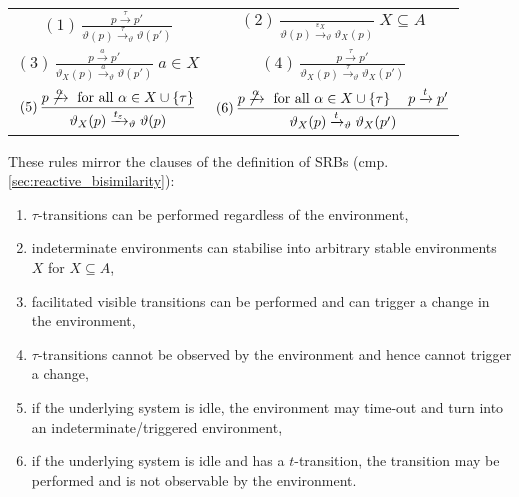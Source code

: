 \begin{isabellebody}
\begin{isamarkuptext}
\begin{tabular}{c c}
$\displaystyle
(1)\,\frac{p \xrightarrow{\tau} p'}{\vartheta(p) \xrightarrow{\tau}_\vartheta \vartheta(p')}
$
&
$\displaystyle
(2)\,\frac{}{\vartheta(p) \xrightarrow{\varepsilon_X}_\vartheta \vartheta_X(p)} \; X \subseteq A
$
\\[2.5em]
$\displaystyle
(3)\,\frac{p \xrightarrow{a} p'}{\vartheta_X(p) \xrightarrow{a}_\vartheta \vartheta(p')} \; a \in X
$
&
$\displaystyle
(4)\,\frac{p \xrightarrow{\tau} p'}{\vartheta_X(p) \xrightarrow{\tau}_\vartheta \vartheta_X(p')}
$
\\[2.5em]
$\displaystyle
(5)\,\frac{p \not\xrightarrow{\alpha} \text{ for all } \alpha \in X \cup \{\tau\}}
{\vartheta_X(p) \xrightarrow{t_\varepsilon}_\vartheta \vartheta(p)}
$
&
$\displaystyle
(6)\,\frac{p \not\xrightarrow{\alpha} \text{ for all } \alpha \in X \cup \{\tau\} \quad\; p \xrightarrow{t} p'}
{\vartheta_X(p) \xrightarrow{t}_\vartheta \vartheta_X(p')}
$
\end{tabular}
\vspace{2\baselineskip}

These rules mirror the clauses of the definition of SRBs (cmp.\@ \cref{sec:reactive_bisimilarity}):

\begin{enumerate}[nosep]
    \item $\tau$-transitions can be performed regardless of the environment,
    \item indeterminate environments can stabilise into arbitrary stable \linebreak environments~$X$ for $X \subseteq A$,
    \item facilitated visible transitions can be performed and can trigger a change in the environment,
    \item $\tau$-transitions cannot be observed by the environment and hence cannot trigger a change,
    \item if the underlying system is idle, the environment may time-out and turn into an indeterminate/triggered environment,
    \item if the underlying system is idle and has a $t$-transition, the transition may be performed and is not observable by the environment.
\end{enumerate}

\end{isamarkuptext}
\end{isabellebody}
